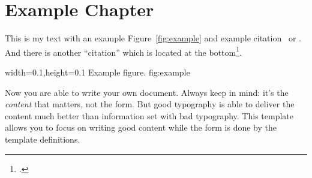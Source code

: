 \chapter{Example Chapter}

This is my text with an example Figure~\ref{fig:example} and example
citation~\cite{StrunkWhite} or \textcite{Bringhurst1993}. And there is another
\enquote{citation} which is located at the bottom\footcite{tagstore}.

  {width=0.1\textwidth,height=0.1\textheight}%
  {Example figure.}%
  {}%
  {fig:example}%

Now you are able to write your own document. Always keep in mind: it's
the \emph{content} that matters, not the form. But good typography is
able to deliver the content much better than information set with bad
typography. This template allows you to focus on writing good content
while the form is done by the template definitions.


